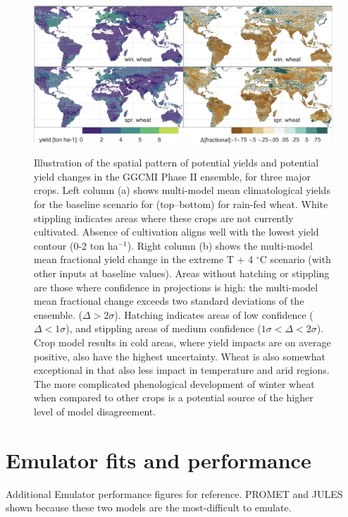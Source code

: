 \documentclass[10pt]{article}
\begin{document}
{\begin{figure}[h!]
\includegraphics[width=\textwidth]{s_wheat_baseline.png}\\
\caption{Illustration of the spatial pattern of potential yields and potential yield changes in the GGCMI Phase II ensemble, for three major crops. Left column (a) shows multi-model mean climatological yields for the baseline scenario for (top--bottom) for rain-fed wheat. White stippling indicates areas where these crops are not currently cultivated. Absence of cultivation aligns well with the lowest yield contour (0-2 ton ha$^{-1}$). Right column (b) shows the multi-model mean fractional yield change in the extreme T + 4 $^{\circ}$C scenario (with other inputs at baseline values). Areas without hatching or stippling are those where confidence in projections is high: the multi-model mean fractional change exceeds two standard deviations of the ensemble. ($\Delta > 2\sigma$). Hatching indicates areas of low confidence ($\Delta < 1 \sigma$), and stippling areas of medium confidence ($1 \sigma < \Delta < 2 \sigma$). Crop model results in cold areas, where yield impacts are on average positive, also have the highest uncertainty. Wheat is also somewhat exceptional in that  also less impact in temperature and arid regions. The more complicated phenological development of winter wheat when compared to other crops is a potential source of the higher level of model disagreement.}
\label{fig:wheatbaseline}
\end{figure}

\clearpage
\section{Emulator fits and performance}
Additional Emulator performance figures for reference. PROMET and JULES shown because these two models are the most-difficult to emulate.


}
\end{document}
